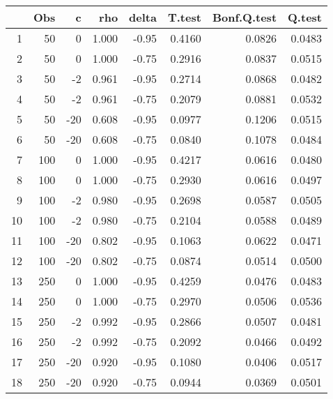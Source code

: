 \begin{table}[ht]
\centering
\begin{tabular}{rrrrrrrr}
  \hline
 & Obs & c & rho & delta & T.test & Bonf.Q.test & Q.test \\ 
  \hline
1 & 50 & 0 & 1.000 & -0.95 & 0.4160 & 0.0826 & 0.0483 \\ 
  2 & 50 & 0 & 1.000 & -0.75 & 0.2916 & 0.0837 & 0.0515 \\ 
  3 & 50 & -2 & 0.961 & -0.95 & 0.2714 & 0.0868 & 0.0482 \\ 
  4 & 50 & -2 & 0.961 & -0.75 & 0.2079 & 0.0881 & 0.0532 \\ 
  5 & 50 & -20 & 0.608 & -0.95 & 0.0977 & 0.1206 & 0.0515 \\ 
  6 & 50 & -20 & 0.608 & -0.75 & 0.0840 & 0.1078 & 0.0484 \\ 
  7 & 100 & 0 & 1.000 & -0.95 & 0.4217 & 0.0616 & 0.0480 \\ 
  8 & 100 & 0 & 1.000 & -0.75 & 0.2930 & 0.0616 & 0.0497 \\ 
  9 & 100 & -2 & 0.980 & -0.95 & 0.2698 & 0.0587 & 0.0505 \\ 
  10 & 100 & -2 & 0.980 & -0.75 & 0.2104 & 0.0588 & 0.0489 \\ 
  11 & 100 & -20 & 0.802 & -0.95 & 0.1063 & 0.0622 & 0.0471 \\ 
  12 & 100 & -20 & 0.802 & -0.75 & 0.0874 & 0.0514 & 0.0500 \\ 
  13 & 250 & 0 & 1.000 & -0.95 & 0.4259 & 0.0476 & 0.0483 \\ 
  14 & 250 & 0 & 1.000 & -0.75 & 0.2970 & 0.0506 & 0.0536 \\ 
  15 & 250 & -2 & 0.992 & -0.95 & 0.2866 & 0.0507 & 0.0481 \\ 
  16 & 250 & -2 & 0.992 & -0.75 & 0.2092 & 0.0466 & 0.0492 \\ 
  17 & 250 & -20 & 0.920 & -0.95 & 0.1080 & 0.0406 & 0.0517 \\ 
  18 & 250 & -20 & 0.920 & -0.75 & 0.0944 & 0.0369 & 0.0501 \\ 
   \hline
\end{tabular}
\end{table}
